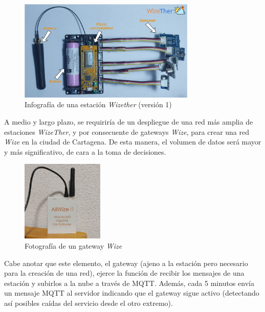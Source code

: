 \documentclass[12pt]{article}
\begin{document}
 \begin{figure}[h]
 	\begin{center}
 		\includegraphics[width=0.75\textwidth]{img/info_wize_sensor_v1.png}
 		\caption{Infografía de una estación \textit{Wizether} (versión 1)}
 	\end{center}
 \end{figure}

\pagebreak

\noindent A medio y largo plazo, se requiriría de un despliegue de una red más amplia de estaciones \textit{WizeTher}, y por consecuente de gateways \textit{Wize}, para crear una red \textit{Wize} en la ciudad de Cartagena. De esta manera, el volumen de datos será mayor y más significativo, de cara a la toma de decisiones. \\

\begin{figure}[h]
	\begin{center}
		\includegraphics[width=0.35\textwidth]{img/gateway_wize.png}
		\caption{Fotografía de un gateway \textit{Wize}}
	\end{center}
\end{figure}

\noindent Cabe anotar que este elemento, el gateway (ajeno a la estación pero necesario para la creación de una red), ejerce la función de recibir los mensajes de una estación y subirlos a la nube a través de MQTT. Además, cada 5 minutos envía un mensaje MQTT al servidor indicando que el gateway sigue activo (detectando así posibles caídas del servicio desde el otro extremo). \\
\end{document}
